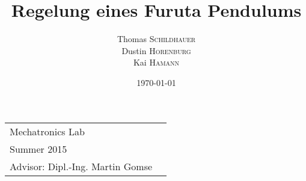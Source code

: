 \title{Regelung eines Furuta Pendulums} %

\author{
Thomas \textsc{Schildhauer} \\
Dustin \textsc{Horenburg} \\
Kai \textsc{Hamann} } %


\date{\today} %



\maketitle %



\begin{center}
\begin{tabular}{l r}
Mechatronics Lab \\
Summer 2015 \\ 
Advisor: Dipl.-Ing. Martin Gomse
\end{tabular}
\end{center}

